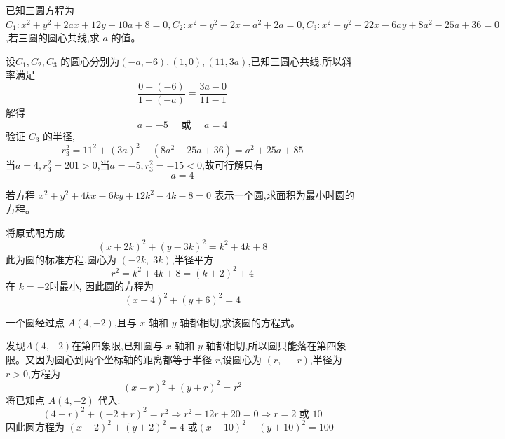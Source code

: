 \begin{questions}
    \question 已知三圆方程为 $C_1: x^2+y^2+2ax+12y+10a+8=0,C_2: x^2+y^2-2x-a^2+2a=0,C_3: x^2+y^2-22x-6ay+8a^2-25a+36=0$,若三圆的圆心共线,求 $a$ 的值。
    \begin{solution}
        设$C_1,C_2,C_3$ 的圆心分别为$(-a, -6),(1, 0),(11, 3a)$,已知三圆心共线,所以斜率满足
        \[
        \frac{0 - (-6)}{1 - (-a)} = \frac{3a - 0}{11 - 1}
        \]
        解得
        \[
        a = -5 \quad \text{ 或 } \quad a = 4
        \]
        验证 $C_3$ 的半径,
        \[
        r_3^2 = 11^2 + (3a)^2 - (8a^2 - 25a + 36) = a^2 + 25a + 85
        \]
        当$a=4, r_3^2 = 201 > 0$,当$a=-5, r_3^2 = -15 < 0$,故可行解只有
        \[
        a = 4
        \]
    \end{solution}

    \question 若方程 $ x^2 + y^2 + 4k x - 6k y + 12k^2 - 4k - 8 = 0 $ 表示一个圆,求面积为最小时圆的方程。
    \begin{solution}
        将原式配方成
        \[
        (x + 2k)^2 + (y - 3k)^2 = k^2 + 4k + 8
        \]
        此为圆的标准方程,圆心为 $(-2k,\; 3k)$,半径平方
        \[
        r^2 = k^2 + 4k + 8 = (k+2)^2+4
        \]
        在 $k = -2$时最小, 因此圆的方程为
        \[
        (x - 4)^2 + (y + 6)^2 = 4
        \]
    \end{solution}
        
    \question 一个圆经过点 \( A(4, -2) \),且与 \(x\) 轴和 \(y\) 轴都相切,求该圆的方程式。
    \begin{solution}
        发现$A(4, -2)$在第四象限,已知圆与 \(x\) 轴和 \(y\) 轴都相切,所以圆只能落在第四象限。又因为圆心到两个坐标轴的距离都等于半径 \(r\),设圆心为 \((r,\; -r)\),半径为 \(r > 0\),方程为
        \[
        (x - r)^2 + (y + r)^2 = r^2
        \]
        将已知点 \(A(4, -2)\) 代入:
        \[
        (4 - r)^2 + (-2 + r)^2 = r^2
        \Rightarrow r^2 - 12r + 20 = 0
        \Rightarrow r = 2 \text{ 或 } 10
        \]
        因此圆方程为 \((x - 2)^2 + (y + 2)^2 = 4\)
        或\((x - 10)^2 + (y + 10)^2 = 100\)
    \end{solution}


\end{questions}
